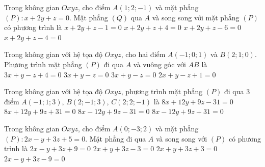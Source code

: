 \begin{ex}%
	Trong không gian $Oxyz$, cho điểm $A(1;2;-1)$ và mặt phẳng $(P)\colon x+2y+z=0$. Mặt  phẳng $(Q)$ qua $A$ và song song với mặt phẳng $(P)$ có phương trình là
	\choice 
		 {$x+2y+z-1=0$}
		 {$x+2y+z+4=0$}
		 {$x+2y+z-6=0$}
		 {\True $x+2y+z-4=0$}
\end{ex}

\begin{ex}%
	Trong không gian với hệ tọa độ $Oxyz$, cho hai điểm $A(-1;0;1)$ và $B(2;1;0)$. Phương trình mặt phẳng  $(P)$ đi qua $A$ và vuông góc với $AB$ là
	 \choice
		{\True $3x + y  - z + 4 = 0$}
		{$3x + y - z = 0$} 
		{$3x + y  - z = 0$}
		{$2x  + y - z + 1 = 0$}
\end{ex}

\begin{ex}%
	 Trong không gian với hệ tọa độ $Oxyz$, phương trình mặt phẳng $(P)$ đi qua $3$ điểm $A(-1;1;3)$, $B(2;-1;3)$, $C(2;2;-1)$ là
	 \choice
		{\True $8x + 12y + 9z  - 31 = 0$}
		{$8x + 12y + 9z  + 31 = 0$}
		{$8x - 12y + 9z -  31 = 0$}
		{$8x - 12y + 9z + 31 = 0$} 
\end{ex}

\begin{ex}%
	[GV:Xuan  Vy Pham]
	Trong không gian $Oxyz$, cho điểm $A(0;-3;2)$ và mặt phẳng $(P) \colon 2x-y+3z+5=0$. Mặt phẳng đi qua $A$ và song song với $(P)$ có phương trình  là
	 \choice
		{$2x-y+3z+9=0$} 
		{$2x+y+3z-3=0$} 
		 {$2x+y+3z+3=0$}
		{\True $2x-y+3z-9=0$} 
\end{ex}

